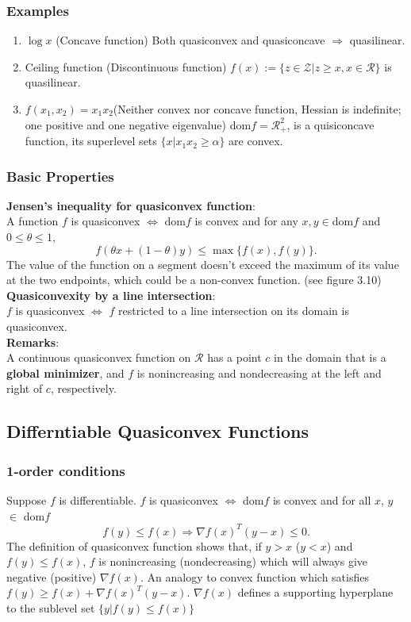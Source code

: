 \subsubsection{Examples}
\begin{enumerate}
   \item{$\log x$} (Concave function) Both quasiconvex and quasiconcave $\Rightarrow$ quasilinear.
   \item{Ceiling function} (Discontinuous function) $f(x):= \{ z \in \mathcal{Z} | z \ge x, x \in \mathcal{R} \}$ is quasilinear.
   \item{$f(x_1,x_2)= x_1x_2$}(Neither convex nor concave function, Hessian is indefinite; one positive and one negative eigenvalue) $ $dom$f= \mathcal{R}_+^2$, is a quisiconcave function, its superlevel sets $\{x| x_1x_2 \ge \alpha \}$ are convex.
\end{enumerate}

\subsubsection{Basic Properties}
{\bf Jensen's inequality for quasiconvex function}: \\
A function $f$ is quasiconvex $\Leftrightarrow$ dom$f$ is convex and for any $x, y \in $dom$f$ and $0\le \theta \le 1$,
\begin{equation}
   f(\theta x+ (1-\theta)y) \le \max\{f(x), f(y)\}.
\end{equation}
The value of the function on a segment doesn't exceed the maximum of its value at the two endpoints, which could be a non-convex function. (see figure 3.10) \\
{\bf Quasiconvexity by a line intersection}: \\
$f$ is quasiconvex $\Leftrightarrow$ $f$ restricted to a line intersection on its domain is quasiconvex. \\
{\bf Remarks}: \\
A continuous quasiconvex function on $\mathcal{R}$ has a point $c$ in the domain that is a {\bf global minimizer}, and $f$ is nonincreasing and nondecreasing at the left and right of $c$, respectively.

\subsection{Differntiable Quasiconvex Functions}
\subsubsection{1-order conditions}
Suppose $f$ is differentiable.
$f$ is quasiconvex $\Leftrightarrow$ dom$f$ is convex and for all $x$, $y$ $\in$ dom$f$
\begin{equation}
   f(y) \le f(x) \Rightarrow \nabla f(x)^T(y-x) \le 0.
\end{equation}
The definition of quasiconvex function shows that, if $y>x$ ($y<x$) and $f(y) \le f(x)$, $f$ is nonincreasing (nondecreasing) which will always give negative (positive) $\nabla f(x)$.
An analogy to convex function which satisfies $f(y) \ge f(x) + \nabla f(x)^T(y-x)$.
$\nabla f(x)$ defines a supporting hyperplane to the sublevel set $\{ y| f(y) \le f(x) \}$

